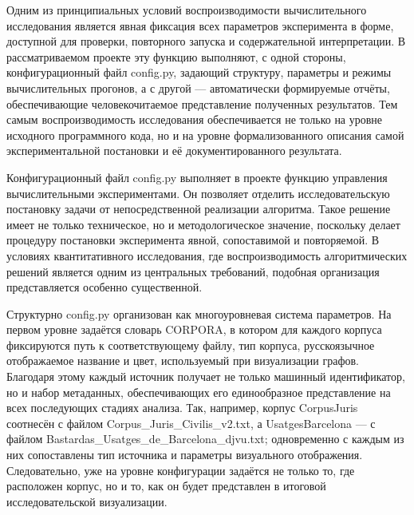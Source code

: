 Одним из принципиальных условий воспроизводимости вычислительного исследования является явная фиксация всех параметров эксперимента в форме, доступной для проверки, повторного запуска и содержательной интерпретации. В рассматриваемом проекте эту функцию выполняют, с одной стороны, конфигурационный файл config.py, задающий структуру, параметры и режимы вычислительных прогонов, а с другой --- автоматически формируемые отчёты, обеспечивающие человекочитаемое представление полученных результатов. Тем самым воспроизводимость исследования обеспечивается не только на уровне исходного программного кода, но и на уровне формализованного описания самой экспериментальной постановки и её документированного результата.

Конфигурационный файл config.py выполняет в проекте функцию управления вычислительными экспериментами. Он позволяет отделить исследовательскую постановку задачи от непосредственной реализации алгоритма. Такое решение имеет не только техническое, но и методологическое значение, поскольку делает процедуру постановки эксперимента явной, сопоставимой и повторяемой. В условиях квантитативного исследования, где воспроизводимость алгоритмических решений является одним из центральных требований, подобная организация представляется особенно существенной.

Структурно config.py организован как многоуровневая система параметров. На первом уровне задаётся словарь CORPORA, в котором для каждого корпуса фиксируются путь к соответствующему файлу, тип корпуса, русскоязычное отображаемое название и цвет, используемый при визуализации графов. Благодаря этому каждый источник получает не только машинный идентификатор, но и набор метаданных, обеспечивающих его единообразное представление на всех последующих стадиях анализа. Так, например, корпус CorpusJuris соотнесён с файлом Corpus\_Juris\_Civilis\_v2.txt, а UsatgesBarcelona --- с файлом Bastardas\_Usatges\_de\_Barcelona\_djvu.txt; одновременно с каждым из них сопоставлены тип источника и параметры визуального отображения. Следовательно, уже на уровне конфигурации задаётся не только то, где расположен корпус, но и то, как он будет представлен в итоговой исследовательской визуализации.

